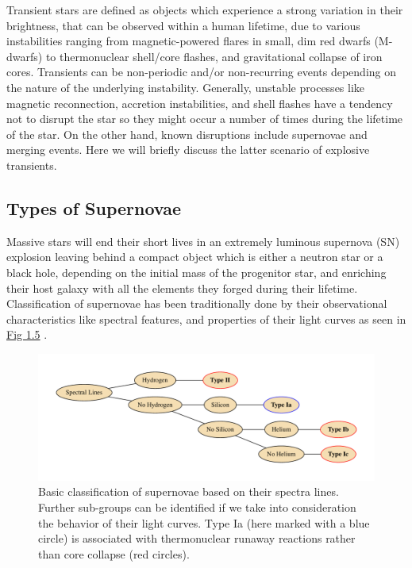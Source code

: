 \documentclass[../../main/thesis_msc.tex]{subfiles}
\begin{document}
		Transient stars are defined as objects which experience a strong variation in their brightness, that can be observed within a human lifetime, due to various instabilities ranging from magnetic-powered flares in small, dim red dwarfs (M-dwarfs) to thermonuclear shell/core flashes, and gravitational collapse of iron cores. Transients can be non-periodic and/or non-recurring events depending on the nature of the underlying instability. Generally, unstable processes like magnetic reconnection, accretion instabilities, and shell flashes have a tendency not to disrupt the star so they might occur a number of times during the lifetime of the star. On the other hand, known disruptions include supernovae and merging events. Here we will briefly discuss the latter scenario of explosive transients.
		
			\subsection{Types of Supernovae}
			
				Massive stars will end their short lives in an extremely luminous supernova (SN) explosion leaving behind a compact object which is either a neutron star or a black hole, depending on the initial mass of the progenitor star, and enriching their host galaxy with all the elements they forged during their lifetime. Classification of supernovae has been traditionally done by their observational characteristics like spectral features, and properties of their light curves as seen in \hyperref[fig:SNe_classification]{Fig 1.5} \citep[see][]{Filippenko1997, Turatto2003}. 
				
				\begin{figure}[h]
					\centering
					\includegraphics[width = \textwidth]{../figures/chapter1/SNeClass.pdf}
					\caption{Basic classification of supernovae based on their spectra lines. Further sub-groups can be identified if we take into consideration the behavior of their light curves. Type Ia (here marked with a blue circle) is associated with thermonuclear runaway reactions rather than core collapse (red circles).}
					\label{fig:SNe_classification}
				\end{figure}
				
\end{document}
